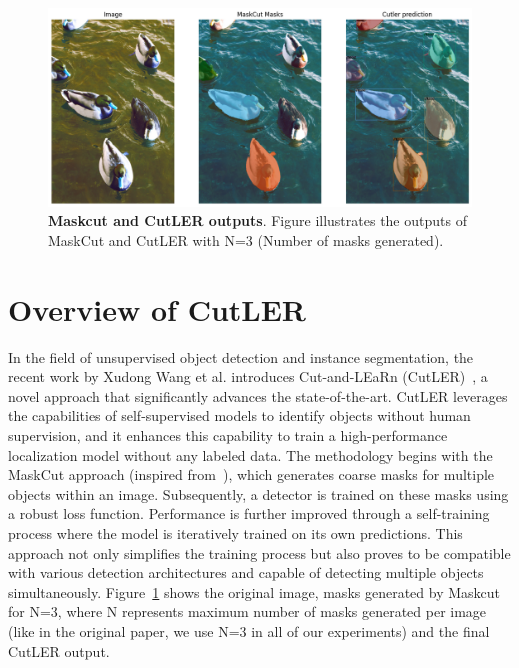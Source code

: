 %
\begin{figure}
	\centering
	\includegraphics[width=1\textwidth]{Images/main/intro_cutler_pic.png}
	\caption[\textbf{Comparison of MaskCut and CutLER Outputs}]{\textbf{Maskcut and CutLER outputs}. Figure illustrates the outputs of MaskCut and CutLER with N=3 (Number of masks generated).}
	\label{fig:mask_cut_cutler_comparison}
\end{figure}

\section{Overview of CutLER}
In the field of unsupervised object detection and instance segmentation, the recent work by Xudong Wang et al. introduces Cut-and-LEaRn (CutLER)~\cite{wang2023cut}, a novel approach that significantly advances the state-of-the-art. CutLER leverages the capabilities of self-supervised models to identify objects without human supervision, and it enhances this capability to train a high-performance localization model without any labeled data. The methodology begins with the MaskCut approach (inspired from~\cite{wang2022tokencut}), which generates coarse masks for multiple objects within an image. Subsequently, a detector is trained on these masks using a robust loss function. Performance is further improved through a self-training process where the model is iteratively trained on its own predictions. This approach not only simplifies the training process but also proves to be compatible with various detection architectures and capable of detecting multiple objects simultaneously. Figure~\ref{fig:mask_cut_cutler_comparison} shows the original image, masks generated by Maskcut for N=3, where N represents maximum number of masks generated per image (like in the original paper, we use N=3 in all of our experiments) and the final CutLER output.

